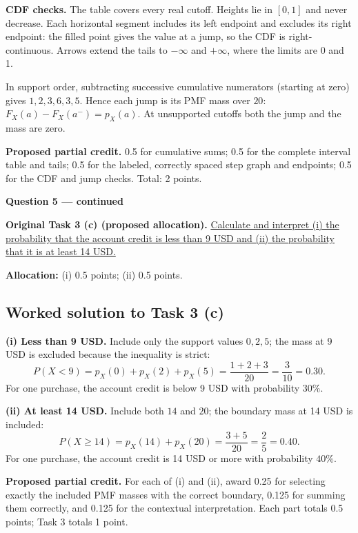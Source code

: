 \textbf{CDF checks.} The table covers every real cutoff. Heights lie in $[0,1]$ and never decrease. Each horizontal segment includes its left endpoint and excludes its right endpoint: the filled point gives the value at a jump, so the CDF is right-continuous. Arrows extend the tails to $-\infty$ and $+\infty$, where the limits are 0 and 1.

In support order, subtracting successive cumulative numerators (starting at zero) gives $1,2,3,6,3,5$. Hence each jump is its PMF mass over $20$: $F_X(a)-F_X(a^-)=p_X(a)$. At unsupported cutoffs both the jump and the mass are zero.

\textbf{Proposed partial credit.} 0.5 for cumulative sums; 0.5 for the complete interval table and tails; 0.5 for the labeled, correctly spaced step graph and endpoints; 0.5 for the CDF and jump checks. Total: 2 points.

\par\vspace{3mm}\secInicio[][sec:q5]

\clearpage
\textbf{Question 5 --- continued}

\textbf{Original Task 3 (c) (proposed allocation).} \hyperref[sol:q5t3]{Calculate and interpret (i) the probability that the account credit is less than 9 USD and (ii) the probability that it is at least 14 USD.} 

\textbf{Allocation:} (i) 0.5 points; (ii) 0.5 points.

\subsection*{Worked solution to Task 3 (c) }
\label{sol:q5t3}

\textbf{(i) Less than 9 USD.} Include only the support values $0,2,5$; the mass at 9 USD is excluded because the inequality is strict:
\[
P(X<9)=p_X(0)+p_X(2)+p_X(5)
=\frac{1+2+3}{20}=\frac3{10}=0.30.
\]
For one purchase, the account credit is below 9 USD with probability $30\%$.

\textbf{(ii) At least 14 USD.} Include both $14$ and $20$; the boundary mass at 14 USD is included:
\[
P(X\geq14)=p_X(14)+p_X(20)=\frac{3+5}{20}=\frac25=0.40.
\]
For one purchase, the account credit is 14 USD or more with probability $40\%$.

\textbf{Proposed partial credit.} For each of (i) and (ii), award 0.25 for selecting exactly the included PMF masses with the correct boundary, 0.125 for summing them correctly, and 0.125 for the contextual interpretation. Each part totals 0.5 points; Task 3 totals 1 point.

